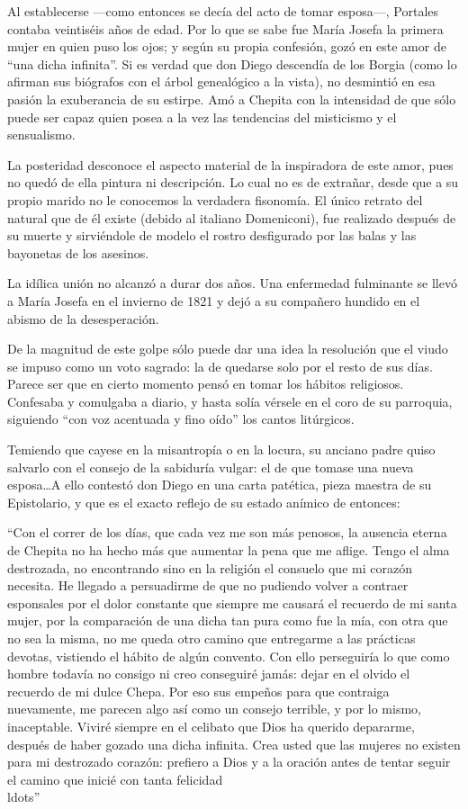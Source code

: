 \documentclass[10pt,twoside,openright]{memoir}
\begin{document}
Al establecerse ---como entonces se decía del acto de tomar esposa---,
Portales contaba veintiséis años de edad. Por lo que se sabe fue María
Josefa la primera mujer en quien puso los ojos; y según su propia
confesión, gozó en este amor de ``una dicha infinita''.
Si es verdad que don Diego descendía
de los Borgia (como lo afirman sus biógrafos con el árbol genealógico a
la vista), no desmintió en esa pasión la exuberancia de su estirpe. Amó
a Chepita con la intensidad de que sólo puede ser capaz quien posea a la
vez las tendencias del misticismo y el sensualismo.

La posteridad desconoce el aspecto material de la inspiradora de este
amor, pues no quedó de ella pintura ni descripción. Lo cual no es de
extrañar, desde que a su propio marido no le conocemos la verdadera
fisonomía. El único retrato del natural que de él existe (debido al
italiano Domeniconi), fue realizado después de su muerte y sirviéndole
de modelo el rostro desfigurado por las balas y las bayonetas de los
asesinos.

La idílica unión no alcanzó a durar dos años. Una enfermedad fulminante
se llevó a María Josefa en el invierno de 1821 y dejó a su compañero
hundido en el abismo de la desesperación.

De la magnitud de este golpe sólo puede dar una idea la resolución que el
viudo se impuso como un voto sagrado: la de quedarse solo por el resto
de sus días. Parece ser que en cierto momento pensó en tomar los hábitos
religiosos. Confesaba y comulgaba a diario, y hasta solía vérsele en el
coro de su parroquia, siguiendo ``con voz acentuada y fino oído'' los
cantos litúrgicos.

Temiendo que cayese en la misantropía o en la locura, su anciano padre
quiso salvarlo con el consejo de la sabiduría vulgar: el de que tomase
una nueva esposa\ldots A ello contestó don Diego en una carta patética,
pieza maestra de su Epistolario, y que es el exacto reflejo de su estado
anímico de entonces:

``Con el correr de los días, que cada
vez me son más penosos, la ausencia eterna de Chepita no ha hecho más
que aumentar la pena que me aflige. Tengo el alma destrozada, no
encontrando sino en la religión el consuelo que mi corazón necesita. He
llegado a persuadirme de que no pudiendo volver a contraer esponsales
por el dolor constante que siempre me causará el recuerdo de mi santa
mujer, por la comparación de una dicha tan pura como fue la mía, con
otra que no sea la misma, no me queda otro camino que entregarme a las
prácticas devotas, vistiendo el hábito de algún convento. Con ello
perseguiría lo que como hombre todavía no consigo ni creo conseguiré
jamás: dejar en el olvido el recuerdo de mi
dulce Chepa. Por eso sus empeños
para que contraiga nuevamente, me parecen algo así como un consejo
terrible, y por lo mismo, inaceptable. Viviré siempre en el celibato
que Dios ha querido depararme, después de haber gozado una dicha
infinita. Crea usted que las mujeres no existen para mi destrozado
corazón: prefiero a Dios y a la oración antes de tentar seguir el camino
que inicié con tanta felicidad\\ldots''
\end{document}
